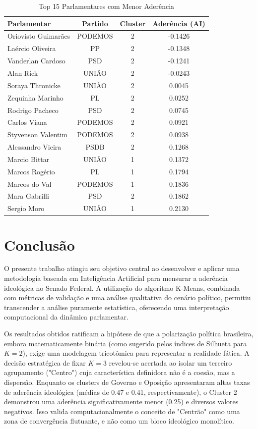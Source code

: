 \documentclass[conference]{IEEEtran}
\begin{document}
\begin{table}[H]
\caption{Top 15 Parlamentares com Menor Aderência}
\begin{center}
\begin{tabular}{|l|c|c|c|}
\hline
\textbf{Parlamentar} & \textbf{Partido} & \textbf{Cluster} & \textbf{Aderência (AI)} \\
\hline
Oriovisto Guimarães & PODEMOS & 2 & -0.1426 \\
Laércio Oliveira & PP & 2 & -0.1348 \\
Vanderlan Cardoso & PSD & 2 & -0.1241 \\
Alan Rick & UNIÃO & 2 & -0.0243 \\
Soraya Thronicke & UNIÃO & 2 & 0.0045 \\
Zequinha Marinho & PL & 2 & 0.0252 \\
Rodrigo Pacheco & PSD & 2 & 0.0745 \\
Carlos Viana & PODEMOS & 2 & 0.0921 \\
Styvenson Valentim & PODEMOS & 2 & 0.0938 \\
Alessandro Vieira & PSDB & 2 & 0.1268 \\
Marcio Bittar & UNIÃO & 1 & 0.1372 \\
Marcos Rogério & PL & 1 & 0.1794 \\
Marcos do Val & PODEMOS & 1 & 0.1836 \\
Mara Gabrilli & PSD & 2 & 0.1862 \\
Sergio Moro & UNIÃO & 1 & 0.2130 \\
\hline
\end{tabular}
\label{tab:least_aligned}
\end{center}
\end{table}



\section{Conclusão}
\label{sec:conclusao}

O presente trabalho atingiu seu objetivo central ao desenvolver e aplicar uma metodologia baseada em Inteligência Artificial para mensurar a aderência ideológica no Senado Federal. A utilização do algoritmo K-Means, combinada com métricas de validação e uma análise qualitativa do cenário político, permitiu transcender a análise puramente estatística, oferecendo uma interpretação computacional da dinâmica parlamentar.

Os resultados obtidos ratificam a hipótese de que a polarização política brasileira, embora matematicamente binária (como sugerido pelos índices de Silhueta para $K=2$), exige uma modelagem tricotômica para representar a realidade fática. A decisão estratégica de fixar $K=3$ revelou-se acertada ao isolar um terceiro agrupamento ("Centro") cuja característica definidora não é a coesão, mas a dispersão. Enquanto os clusters de Governo e Oposição apresentaram altas taxas de aderência ideológica (médias de 0.47 e 0.41, respectivamente), o Cluster 2 demonstrou uma aderência significativamente menor (0.25) e diversos valores negativos. Isso valida computacionalmente o conceito de "Centrão" como uma zona de convergência flutuante, e não como um bloco ideológico monolítico.
\end{document}
